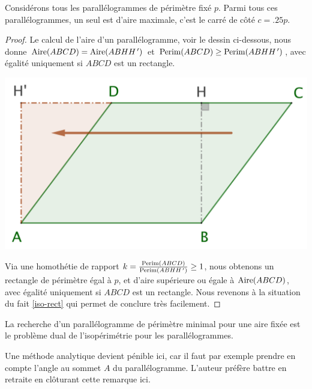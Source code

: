 \begin{fact} \label{iso-para}
	Considérons tous les parallélogrammes de périmètre fixé $p$. Parmi tous ces parallélogrammes, un seul est d'aire maximale, c'est le carré de côté $c = \num{.25} p$.
\end{fact}


\begin{proof}
	Le calcul de l'aire d'un parallélogramme, voir le dessin ci-dessous, nous donne 
	$\mathrm{Aire}(ABCD) = \mathrm{Aire}(ABHH^{\,\prime})$ et 
	$\mathrm{Perim}(ABCD) \geq \mathrm{Perim}(ABHH^{\,\prime})$, 
	avec égalité uniquement si $ABCD$ est un rectangle. 
	
	\begin{center}
		\includegraphics[scale=.4]{content/parallelogram/parallelogram.png}
	\end{center}
	
	Via une homothétie de rapport $k = \frac{\mathrm{Perim}(ABCD)}{\mathrm{Perim}(ABHH^{\,\prime})} \geq 1$, nous obtenons un rectangle 
	de périmètre égal à $p$,
	et d'aire supérieure ou égale à $\mathrm{Aire}(ABCD)$, 
	avec égalité uniquement si $ABCD$ est un rectangle.
	Nous revenons à la situation du fait \ref{iso-rect} qui permet de conclure très facilement.
\end{proof}




\begin{remark}
	La recherche d'un parallélogramme de périmètre minimal pour une aire fixée est le problème dual de l'isopérimétrie pour les parallélogrammes.
\end{remark}




\begin{remark}
	Une méthode analytique devient pénible ici, car il faut par exemple prendre en compte l'angle au sommet $A$ du parallélogramme. L'auteur préfère battre en retraite en clôturant cette remarque ici.
\end{remark}
